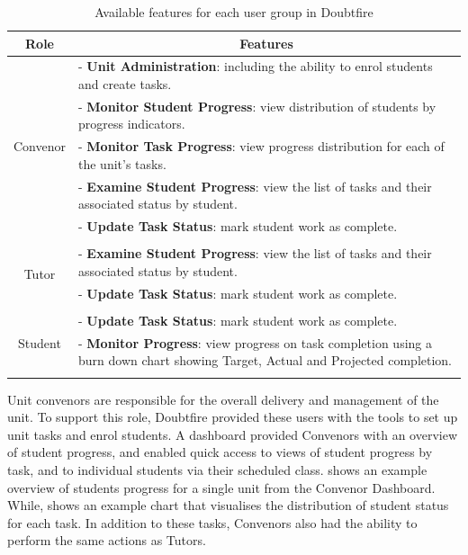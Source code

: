 \begin{table}[htbp]
  \renewcommand{\arraystretch}{1.6}
  \centering
  \caption{Available features for each user group in Doubtfire}
  \label{tab:user_features}
  \begin{tabular}{c|p{}}
    Role & \multicolumn{1}{c}{Features} \\ \hline\hline
    \multirow{5}{*}{\begin{sideways}\parbox{14mm}{Convenor}\end{sideways}}
    & - \textbf{Unit Administration}: including the ability to enrol students and create tasks. \\
    & - \textbf{Monitor Student Progress}: view distribution of students by progress indicators. \\
    & - \textbf{Monitor Task Progress}: view progress distribution for each of the unit's tasks. \\
    & - \textbf{Examine Student Progress}: view the list of tasks and their associated status by student. \\
    & - \textbf{Update Task Status}: mark student work as complete. \\ 
    & \\
    \hline\hline
    \multirow{2}{*}{\begin{sideways}\parbox{10mm}{Tutor}\end{sideways}}
    & - \textbf{Examine Student Progress}: view the list of tasks and their associated status by student. \\
    & - \textbf{Update Task Status}: mark student work as complete. \\ 
    & \\
    \hline\hline
    \multirow{3}{*}{\begin{sideways}\parbox{11mm}{Student}\end{sideways}}
    & - \textbf{Update Task Status}: mark student work as complete. \\ 
    & - \textbf{Monitor Progress}: view progress on task completion using a burn down chart showing Target, Actual and Projected completion. \\
    & \\
  \end{tabular}
\end{table}

Unit convenors are responsible for the overall delivery and management of the unit. To support this role, Doubtfire provided these users with the tools to set up unit tasks and enrol students. A dashboard provided Convenors with an overview of student progress, and enabled quick access to views of student progress by task, and to individual students via their scheduled class.  shows an example overview of students progress for a single unit from the Convenor Dashboard. While,  shows an example chart that visualises the distribution of student status for each task. In addition to these tasks, Convenors also had the ability to perform the same actions as Tutors.

